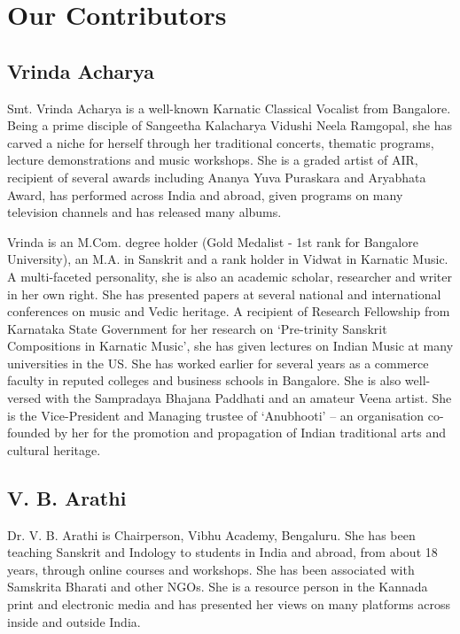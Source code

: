 
\chapter*{Our Contributors }\label{contributors}

\section*{Vrinda Acharya}

Smt. Vrinda Acharya is a well-known Karnatic Classical Vocalist from Bangalore. Being a prime disciple of Sangeetha Kalacharya Vidushi Neela Ramgopal, she has carved a niche for herself through her traditional concerts, thematic programs, lecture demonstrations and music workshops. She is a graded artist of AIR, recipient of several awards including Ananya Yuva Puraskara and Aryabhata Award, has performed across India and abroad, given programs on many television channels and has released many albums.

Vrinda is an M.Com. degree holder (Gold Medalist - 1st rank for Bangalore University), an M.A. in Sanskrit and a rank holder in Vidwat in Karnatic Music. A multi-faceted personality, she is also an academic scholar, researcher and writer in her own right. She has presented papers at several national and international conferences on music and Vedic heritage. A recipient of Research Fellowship from Karnataka State Government for her research on ‘Pre-trinity Sanskrit Compositions in Karnatic Music’, she has given lectures on Indian Music at many universities in the US. She has worked earlier for several years as a commerce faculty in reputed colleges and business schools in Bangalore. She is also well-versed with the Sampradaya Bhajana Paddhati and an amateur Veena artist. She is the Vice-President and Managing trustee of ‘Anubhooti’ – an organisation co-founded by her for the promotion and propagation of Indian traditional arts and cultural heritage.


\section*{V. B. Arathi}

Dr. V. B. Arathi is Chairperson, Vibhu Academy, Bengaluru. She has been teaching Sanskrit and Indology to students in India and abroad, from about 18 years, through online courses and workshops. She has been associated with Samskrita Bharati and other NGOs. She is a resource person in the Kannada print and electronic media and has presented her views on many platforms across inside and outside India.

